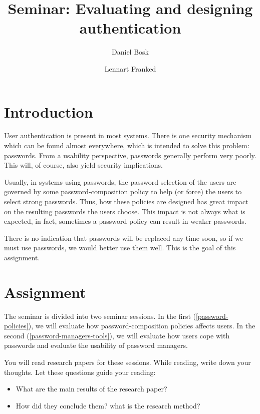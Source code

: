 \title{Seminar: Evaluating and designing authentication}

\author{%
  Daniel Bosk
  \and
  Lennart Franked
}

\maketitle

\begin{abstract}
  
\end{abstract}


\section{Introduction}%
\label{sec:intro}

User authentication is present in most systems.
There is one security mechanism which can be found almost everywhere, which is 
intended to solve this problem: passwords.
From a usability perspective, passwords generally perform very poorly.
This will, of course, also yield security implications.

Usually, in systems using passwords, the password selection of the users are 
governed by some password-composition policy to help (or force) the users to 
select strong passwords.
Thus, how these policies are designed has great impact on the resulting 
passwords the users choose.
This impact is not always what is expected, in fact, sometimes a password 
policy can result in weaker passwords.

There is no indication that passwords will be replaced any time soon, so if we 
must use passwords, we would better use them well.
This is the goal of this assignment.


\section{Assignment}%
\label{sec:tasks}

The seminar is divided into two seminar sessions.
In the first (\cref{password-policies}), we will evaluate how 
password-composition policies affects users.
In the second (\cref{password-managers-tools}), we will evaluate how users cope 
with passwords and evaluate the usability of password managers.

You will read research papers for these sessions.
While reading, write down your thoughts.
Let these questions guide your reading:
\begin{itemize}
  \item What are the main results of the research paper?
  \item How did they conclude them?
    \Ie what is the research method?
\end{itemize}

